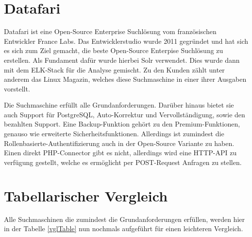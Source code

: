 \section{Datafari}
\label{datafari}

Datafari ist eine Open-Source Enterprise Suchlösung vom französischen Entwickler France Labs. Das Entwicklerstudio wurde 2011 gegründet und hat sich es sich zum Ziel gemacht, die beste Open-Source Enterpise Suchlösung zu erstellen. \cite{Labs.2019} Als Fundament dafür wurde hierbei Solr verwendet. Dies wurde dann mit dem ELK-Stack für die Analyse gemischt. Zu den Kunden zählt unter anderem das Linux Magazin, welches diese Suchmaschine in einer ihrer Ausgaben vorstellt. \cite{MichaelBrandenburg.2019}

Die Suchmaschine erfüllt alle Grundanforderungen. Darüber hinaus bietet sie auch Support für PostgreSQL, Auto-Korrektur und Vervollständigung, sowie den bezahlten Support. Eine Backup-Funktion gehört zu den Premium-Funktionen, genauso wie erweiterte Sicherheitsfunktionen. Allerdings ist zumindest die Rollenbasierte-Authentifizierung auch in der Open-Source Variante zu haben. Einen direkt PHP-Connector gibt es nicht, allerdings wird eine HTTP-API zu verfügung gestellt, welche es ermöglicht per POST-Request Anfragen zu stellen. \cite{Labs.b}

\section{Tabellarischer Vergleich}

Alle Suchmaschinen die zumindest die Grundanforderungen erfüllen, werden hier in der Tabelle \ref{vglTable} nun nochmals aufgeführt für einen leichteren Vergleich.

